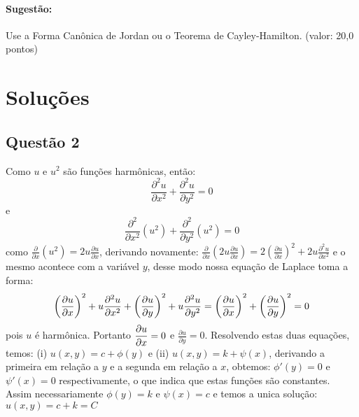 \paragraph{Sugest\~ao:} Use a Forma Canônica de Jordan ou o Teorema de Cayley-Hamilton. (valor: 20,0 pontos)

\section{\color{red} Solu\c c\~oes}

\subsection{\color{red} Quest\~ao 2}

Como $u$ e $u^2$ s\~ao fun\c c\~oes harmônicas, ent\~ao: $$\frac{\partial^2u}{\partial x^2}+\frac{\partial^2u}{\partial y^2}=0$$ e $$\frac{\partial^2}{\partial x^2}(u^2)+\frac{\partial^2}{\partial y^2}(u^2)=0$$ como $\frac{\partial}{\partial x}(u^2)=2u\frac{\partial u}{\partial x}$, derivando novamente: $\frac{\partial}{\partial x}\left(2u\frac{\partial u}{\partial x}\right)=2\left(\frac{\partial u}{\partial x}\right)^2+2u\frac{\partial^2 u}{\partial x^2}$ e o mesmo acontece com a vari\'avel $y$, desse modo nossa equa\c c\~ao de Laplace toma a forma: $$\left(\frac{\partial u}{\partial x}\right)^2+u{\partial^2 u\over\partial x^2}+\left(\frac{\partial u}{\partial y}\right)^2+u{\partial^2 u\over\partial y^2}=\left({\partial u\over\partial x}\right)^2+\left({\partial u\over\partial y}\right)^2=0$$ pois  $u$ \'e harm\^onica. Portanto $\displaystyle{\partial u\over\partial x}=0$ e $\displaystyle\frac{\partial u}{\partial y}=0$. Resolvendo estas duas equa\c c\~oes, temos: (i) $u(x,y)= c+\phi(y)$ e (ii) $u(x,y)=k+\psi(x)$, derivando a primeira em rela\c c\~ao a $y$ e a segunda em rela\c c\~ao a $x$, obtemos: $\phi'(y)=0$ e $\psi'(x)=0$ respectivamente, o que indica que estas fun\c c\~oes s\~ao constantes. Assim necessariamente $\phi(y)=k$ e $\psi(x)=c$ e temos a unica solu\c c\~ao: $u(x,y)=c+k=C$


